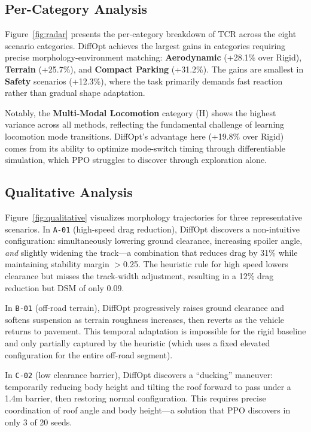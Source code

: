 \subsection{Per-Category Analysis}

Figure~\ref{fig:radar} presents the per-category breakdown of TCR across the eight scenario categories. DiffOpt achieves the largest gains in categories requiring precise morphology-environment matching: \textbf{Aerodynamic} (+28.1\% over Rigid), \textbf{Terrain} (+25.7\%), and \textbf{Compact Parking} (+31.2\%). The gains are smallest in \textbf{Safety} scenarios (+12.3\%), where the task primarily demands fast reaction rather than gradual shape adaptation.

Notably, the \textbf{Multi-Modal Locomotion} category (H) shows the highest variance across all methods, reflecting the fundamental challenge of learning locomotion mode transitions. DiffOpt's advantage here (+19.8\% over Rigid) comes from its ability to optimize mode-switch timing through differentiable simulation, which PPO struggles to discover through exploration alone.

\subsection{Qualitative Analysis}

Figure~\ref{fig:qualitative} visualizes morphology trajectories for three representative scenarios. In \texttt{A-01} (high-speed drag reduction), DiffOpt discovers a non-intuitive configuration: simultaneously lowering ground clearance, increasing spoiler angle, \emph{and} slightly widening the track---a combination that reduces drag by 31\% while maintaining stability margin $>$0.25. The heuristic rule for high speed lowers clearance but misses the track-width adjustment, resulting in a 12\% drag reduction but DSM of only 0.09.

In \texttt{B-01} (off-road terrain), DiffOpt progressively raises ground clearance and softens suspension as terrain roughness increases, then reverts as the vehicle returns to pavement. This temporal adaptation is impossible for the rigid baseline and only partially captured by the heuristic (which uses a fixed elevated configuration for the entire off-road segment).

In \texttt{C-02} (low clearance barrier), DiffOpt discovers a ``ducking'' maneuver: temporarily reducing body height and tilting the roof forward to pass under a 1.4m barrier, then restoring normal configuration. This requires precise coordination of roof angle and body height---a solution that PPO discovers in only 3 of 20 seeds.
